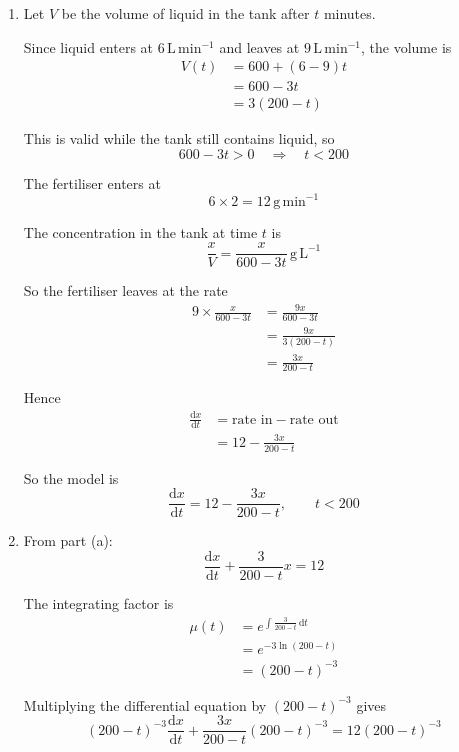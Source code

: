 \documentclass[leqno]{article}
\begin{document}
\begin{enumerate}[
  label=\textbf{\arabic*.},
  leftmargin=*,
  topsep=0pt,
  partopsep=0pt,
  parsep=0pt
]
\vspace*{10pt}

\begin{djsSolution}
\begin{enumerate}[label=\textbf{(\alph*)}]
  \item Let \(V\) be the volume of liquid in the tank after \(t\) minutes.

  Since liquid enters at \(6\,\mathrm{L\,min^{-1}}\) and leaves at \(9\,\mathrm{L\,min^{-1}}\), the volume is
  \begin{align*}
  V(t)&=600+(6-9)t\\
      &=600-3t\\
      &=3(200-t)
  \end{align*}

  This is valid while the tank still contains liquid, so
  \[
  600-3t>0\quad\Longrightarrow\quad t<200
  \]

  The fertiliser enters at
  \[
  6 \times 2 = 12\,\mathrm{g\,min^{-1}}
  \]

  The concentration in the tank at time \(t\) is
  \[
  \frac{x}{V}=\frac{x}{600-3t}\,\mathrm{g\,L^{-1}}
  \]

  So the fertiliser leaves at the rate
  \begin{align*}
  9 \times \frac{x}{600-3t}
  &=\frac{9x}{600-3t}\\
  &=\frac{9x}{3(200-t)}\\
  &=\frac{3x}{200-t}
  \end{align*}

  Hence
  \begin{align*}
  \frac{\mathrm{d}x}{\mathrm{d}t}
  &=\text{rate in} - \text{rate out}\\
  &=12-\frac{3x}{200-t}
  \end{align*}

  So the model is
  \[
  \frac{\mathrm{d}x}{\mathrm{d}t}=12-\frac{3x}{200-t}, \qquad t<200
  \]

  \item From part (a):
  \[
  \frac{\mathrm{d}x}{\mathrm{d}t}+\frac{3}{200-t}x=12
  \]

  The integrating factor is
  \begin{align*}
  \mu(t)&=e^{\int \frac{3}{200-t}\,\mathrm{d}t}\\
  &=e^{-3\ln(200-t)}\\
  &=(200-t)^{-3}
  \end{align*}

  Multiplying the differential equation by \((200-t)^{-3}\) gives
  \[
  (200-t)^{-3}\frac{\mathrm{d}x}{\mathrm{d}t}+\frac{3x}{200-t}(200-t)^{-3}=12(200-t)^{-3}
  \]


\end{enumerate}
\end{djsSolution}
\end{enumerate}
\end{document}
